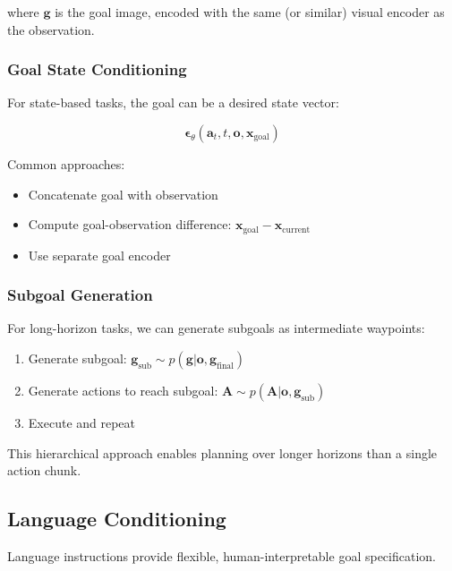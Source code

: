 where $\mathbf{g}$ is the goal image, encoded with the same (or similar) visual encoder as the observation.

\subsubsection{Goal State Conditioning}

For state-based tasks, the goal can be a desired state vector:

\begin{equation}
\boldsymbol{\epsilon}_\theta(\mathbf{a}_t, t, \mathbf{o}, \mathbf{x}_{\text{goal}})
\label{eq:goal_state_conditioning}
\end{equation}

Common approaches:
\begin{itemize}
    \item Concatenate goal with observation
    \item Compute goal-observation difference: $\mathbf{x}_{\text{goal}} - \mathbf{x}_{\text{current}}$
    \item Use separate goal encoder
\end{itemize}

\subsubsection{Subgoal Generation}

For long-horizon tasks, we can generate subgoals as intermediate waypoints:

\begin{enumerate}
    \item Generate subgoal: $\mathbf{g}_{\text{sub}} \sim p(\mathbf{g} | \mathbf{o}, \mathbf{g}_{\text{final}})$
    \item Generate actions to reach subgoal: $\mathbf{A} \sim p(\mathbf{A} | \mathbf{o}, \mathbf{g}_{\text{sub}})$
    \item Execute and repeat
\end{enumerate}

This hierarchical approach enables planning over longer horizons than a single action chunk.

\subsection{Language Conditioning}
\label{subsec:language_conditioning}

Language instructions provide flexible, human-interpretable goal specification.

